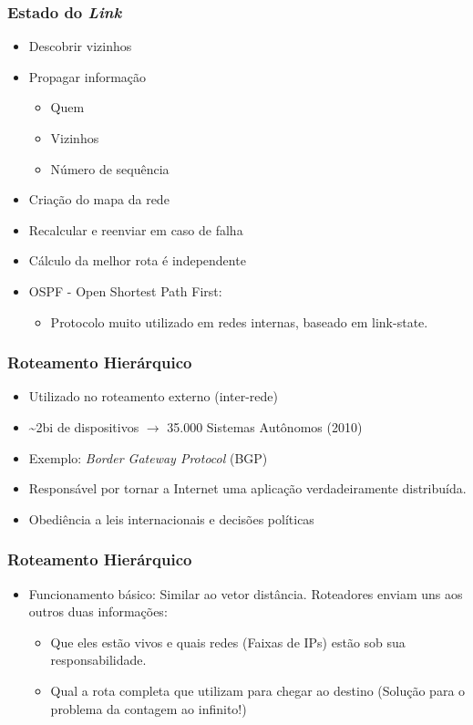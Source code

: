 \documentclass{beamer}
\begin{document}
\begin{frame}
\frametitle{Estado do \emph{Link}}

\begin{itemize}
  \item Descobrir vizinhos
  \item Propagar informação
  \begin{itemize}
     \item Quem
     \item Vizinhos
     \item Número de sequência
  \end{itemize}
  \item Criação do mapa da rede
  \item Recalcular e reenviar em caso de falha
  \item Cálculo da melhor rota é independente
  \item OSPF - Open Shortest Path First:
  \begin{itemize}
     \item Protocolo muito utilizado em redes internas,
        baseado em link-state.
  \end{itemize}
\end{itemize}
\end{frame}

\begin{frame}
\frametitle{Roteamento Hierárquico}
\begin{itemize}
  \setlength{\itemsep}{0.7cm}%
  \item Utilizado no roteamento externo (inter-rede)
  \item \textasciitilde2bi de dispositivos $\to$ 35.000 Sistemas Autônomos
  (2010)
  \item Exemplo: \emph{Border Gateway Protocol} (BGP)
  \item Responsável por tornar a Internet uma aplicação verdadeiramente distribuída.
  \item Obediência a leis internacionais e decisões políticas
\end{itemize}
\end{frame}

\begin{frame}
\frametitle{Roteamento Hierárquico}
\begin{itemize}
  \item Funcionamento básico: Similar ao vetor distância. Roteadores enviam uns
  aos outros duas informações:
  \begin{itemize}
    \item Que eles estão vivos e quais redes (Faixas de IPs) estão sob sua
    responsabilidade.
    \item Qual a rota completa que utilizam para chegar ao destino (Solução para
    o problema da contagem ao infinito!)
  \end{itemize}
\end{itemize}
\end{frame}
\end{document}
